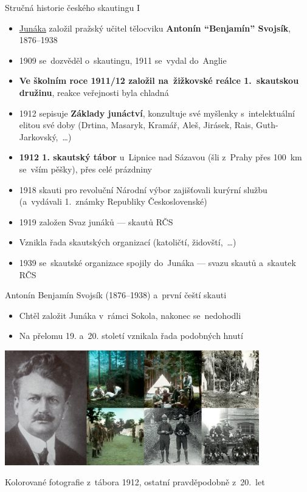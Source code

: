 \documentclass[compress, xelatex, 11pt, xcolor=dvipsnames, print, aspectratio=169,
	hyperref={
		bookmarks=true,
		unicode=true,
		colorlinks=true,
		pdftitle={Skautska vychovna metoda},
		plainpages=false,
		pdfauthor={Vojtech Zeisek},
		pdfsubject={Skautska vychovna metoda a jeji vyvoj za posledni stoleti a desetileti},
		pdfcreator={XeLaTeX},
		pdfkeywords={Junak, Pedagogika, Skaut, Skauting, Vychovna metoda},
		linkcolor=Red, %
		anchorcolor=ForestGreen, %
		citecolor=ForestGreen, %
		filecolor=ForestGreen, %
		menucolor=ForestGreen, %
		urlcolor=Sepia, %
		pdftex},
	url={hyphens, lowtilde} %
	]{beamer}
\begin{document}
\begin{frame}{Stručná historie českého skautingu I}
	\begin{itemize}
		\item \href{https://www.skaut.cz/skauting/historie/}{Junáka} založil pražský učitel tělocviku \textbf{Antonín \enquote{Benjamín} Svojsík}, 1876--1938
		\item 1909 se~dozvěděl o~skautingu, 1911 se~vydal do~Anglie
		\item \textbf{Ve školním roce 1911/12 založil na~žižkovské reálce 1.~skautskou družinu}, reakce veřejnosti byla chladná
		\item 1912 sepisuje \textbf{Základy junáctví}, konzultuje své myšlenky s~intelektuální elitou své doby (Drtina, Masaryk, Kramář, Aleš, Jirásek, Rais, Guth-Jarkovský,~\ldots)
		\item \textbf{1912 1. skautský tábor} u~Lipnice nad Sázavou (šli z~Prahy přes 100~km se~vším pěšky), přes celé prázdniny
		\item 1918 skauti pro revoluční Národní výbor zajišťovali kurýrní službu (a~vydávali 1.~známky Republiky Československé)
		\item 1919 založen Svaz junáků --- skautů RČS
		\item Vznikla řada skautských organizací (katoličtí, židovští,~\ldots)
		\item 1939 se~skautské organizace spojily do~Junáka --- svazu skautů a~skautek RČS
	\end{itemize}
\end{frame}

\begin{frame}{Antonín Benjamín Svojsík (1876--1938) a~první čeští skauti}
	\begin{itemize}
		\item Chtěl založit Junáka v~rámci Sokola, nakonec se~nedohodli
		\item Na přelomu 19. a~20. století vznikala řada podobných hnutí
	\end{itemize}
	\begin{center}
		\includegraphics[height=5cm]{svojsik_prvni_skauti.jpg}
	\end{center}
	\begin{flushright}
		Kolorované fotografie z~tábora 1912, ostatní pravděpodobně z~20.~let
	\end{flushright}
\end{frame}
\end{document}
